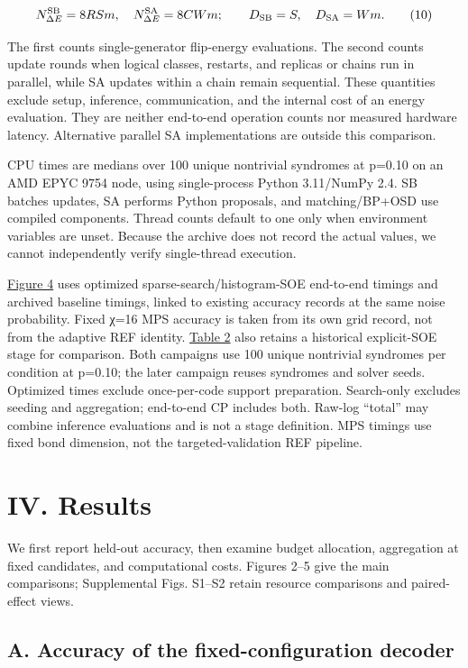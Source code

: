 \documentclass[
  10pt,
]{article}
\begin{document}
\[
N_{\Delta E}^{\rm SB}=8RSm,\quad
N_{\Delta E}^{\rm SA}=8CWm;\qquad
D_{\rm SB}=S,\quad D_{\rm SA}=Wm.
\tag{10}\label{eq:10}
\]

The first counts single-generator flip-energy evaluations. The second
counts update rounds when logical classes, restarts, and replicas or
chains run in parallel, while SA updates within a chain remain
sequential. These quantities exclude setup, inference, communication,
and the internal cost of an energy evaluation. They are neither
end-to-end operation counts nor measured hardware latency. Alternative
parallel SA implementations are outside this comparison.

CPU times are medians over 100 unique nontrivial syndromes at p=0.10 on
an AMD EPYC 9754 node, using single-process Python 3.11/NumPy 2.4. SB
batches updates, SA performs Python proposals, and matching/BP+OSD use
compiled components. Thread counts default to one only when environment
variables are unset. Because the archive does not record the actual
values, we cannot independently verify single-thread execution.

\hyperref[fig:4]{Figure 4} uses optimized sparse-search/histogram-SOE end-to-end timings
and archived baseline timings, linked to existing accuracy records at
the same noise probability. Fixed χ=16 MPS accuracy is taken from its
own grid record, not from the adaptive REF identity. \hyperref[tab:2]{Table 2} also
retains a historical explicit-SOE stage for comparison. Both campaigns
use 100 unique nontrivial syndromes per condition at p=0.10; the later
campaign reuses syndromes and solver seeds. Optimized times exclude
once-per-code support preparation. Search-only excludes seeding and
aggregation; end-to-end CP includes both. Raw-log ``total'' may combine
inference evaluations and is not a stage definition. MPS timings use
fixed bond dimension, not the targeted-validation REF pipeline.

\section{IV. Results}\label{iv.-results}

We first report held-out accuracy, then examine budget allocation,
aggregation at fixed candidates, and computational costs. Figures 2--5
give the main comparisons; Supplemental Figs. S1--S2 retain resource
comparisons and paired-effect views.

\subsection{A. Accuracy of the fixed-configuration
decoder}\label{a.-accuracy-of-the-fixed-configuration-decoder}
\end{document}
